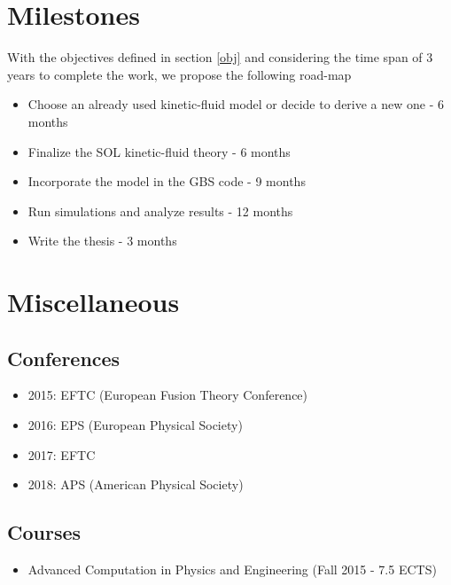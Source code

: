 \section{Milestones}

With the objectives defined in section \ref{obj} and considering the time span of 3 years to complete the work, we propose the following road-map 

\begin{itemize}
\item Choose an already used kinetic-fluid model or decide to derive a new one - 6 months
\item Finalize the SOL kinetic-fluid theory - 6 months
\item Incorporate the model in the GBS code - 9 months
\item Run simulations and analyze results - 12 months
\item Write the thesis - 3 months
\end{itemize}


\section{Miscellaneous}

\subsection{Conferences}
\begin{itemize}
\item 2015: EFTC (European Fusion Theory Conference)
\item 2016: EPS  (European Physical Society)
\item 2017: EFTC
\item 2018: APS (American Physical Society)
\end{itemize}

\subsection{Courses}

\begin{itemize}
\item Advanced Computation in Physics and Engineering (Fall 2015 - 7.5 ECTS)
\end{itemize}





